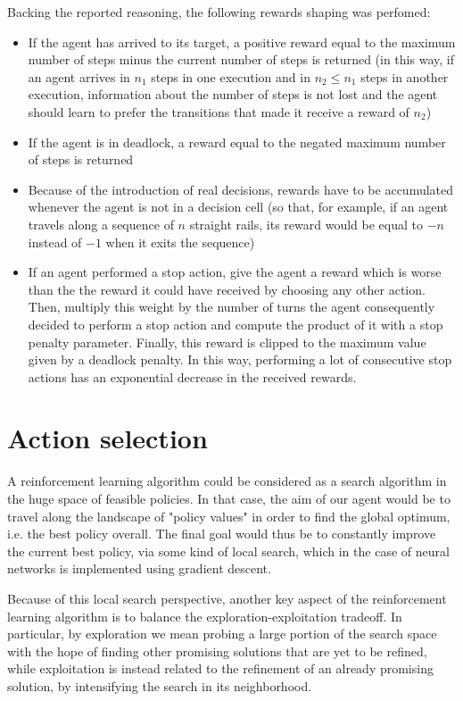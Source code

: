 \documentclass[a4paper,10pt]{report}
\begin{document}
Backing the reported reasoning, the following rewards shaping was perfomed:
\begin{itemize}
	\item If the agent has arrived to its target, a positive reward equal to the maximum number of steps minus the current number of steps is returned (in this way, if an agent arrives in $n_1$ steps in one execution and in $n_2\le n_1$ steps in another execution, information about the number of steps is not lost and the agent should learn to prefer the transitions that made it receive a reward of $n_2$)
	\item If the agent is in deadlock, a reward equal to the negated maximum number of steps is returned
	\item Because of the introduction of real decisions, rewards have to be accumulated whenever the agent is not in a decision cell (so that, for example, if an agent travels along a sequence of $n$ straight rails, its reward would be equal to $-n$ instead of $-1$ when it exits the sequence)
	\item If an agent performed a stop action, give the agent a reward which is worse than the the reward it could have received by choosing any other action. Then, multiply this weight by the number of turns the agent consequently decided to perform a stop action and compute the product of it with a stop penalty parameter. Finally, this reward is clipped to the maximum value given by a deadlock penalty. In this way, performing a lot of consecutive stop actions has an exponential decrease in the received rewards.
\end{itemize}

\section{Action selection}
A reinforcement learning algorithm could be considered as a search algorithm in the huge space of feasible policies. In that case, the aim of our agent would be to travel along the landscape of "policy values" in order to find the global optimum, i.e. the best policy overall. The final goal would thus be to constantly improve the current best policy, via some kind of local search, which in the case of neural networks is implemented using gradient descent.

Because of this local search perspective, another key aspect of the reinforcement learning algorithm is to balance the exploration-exploitation tradeoff. In particular, by exploration we mean probing a large portion of the search space with the hope of finding other promising solutions that are yet to be refined, while exploitation is instead related to the refinement of an already promising solution, by intensifying the search in its neighborhood.
\end{document}

